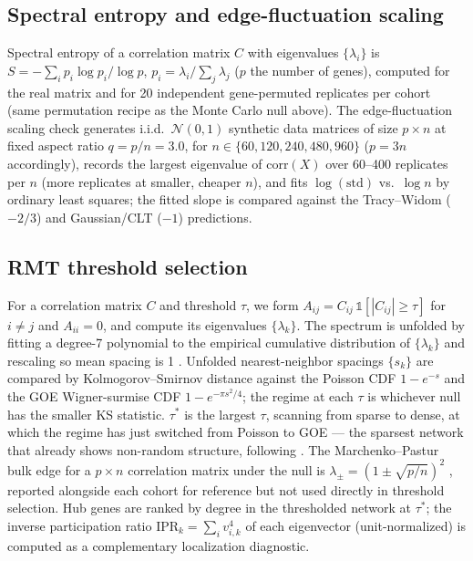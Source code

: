 \documentclass[11pt]{article}
\begin{document}
\subsection{Spectral entropy and edge-fluctuation scaling}

Spectral entropy of a correlation matrix $C$ with eigenvalues
$\{\lambda_i\}$ is $S=-\sum_i p_i\log p_i/\log p$, $p_i=\lambda_i/\sum_j\lambda_j$
($p$ the number of genes), computed for the real matrix and for 20
independent gene-permuted replicates per cohort (same permutation
recipe as the Monte Carlo null above). The edge-fluctuation scaling
check generates i.i.d.\ $\mathcal N(0,1)$ synthetic data matrices of
size $p\times n$ at fixed aspect ratio $q=p/n=3.0$, for
$n\in\{60,120,240,480,960\}$ ($p=3n$ accordingly), records the largest
eigenvalue of $\mathrm{corr}(X)$ over 60--400 replicates per $n$
(more replicates at smaller, cheaper $n$), and fits
$\log(\mathrm{std})$ vs.\ $\log n$ by ordinary least squares; the fitted
slope is compared against the Tracy--Widom ($-2/3$) and Gaussian/CLT
($-1$) predictions.

\subsection{RMT threshold selection}

For a correlation matrix $C$ and threshold $\tau$, we form
$A_{ij}=C_{ij}\,\mathbb{1}[|C_{ij}|\ge\tau]$ for $i\neq j$ and
$A_{ii}=0$, and compute its eigenvalues $\{\lambda_k\}$. The spectrum is
unfolded by fitting a degree-7 polynomial to the empirical cumulative
distribution of $\{\lambda_k\}$ and rescaling so mean spacing is 1
\citep{luo2007}. Unfolded nearest-neighbor spacings $\{s_k\}$ are
compared by Kolmogorov--Smirnov distance against the Poisson CDF
$1-e^{-s}$ and the GOE Wigner-surmise CDF $1-e^{-\pi s^2/4}$; the
regime at each $\tau$ is whichever null has the smaller KS statistic.
$\tau^*$ is the largest $\tau$, scanning from sparse to dense, at which
the regime has just switched from Poisson to GOE --- the sparsest
network that already shows non-random structure, following
\citet{luo2007}. The Marchenko--Pastur bulk edge for a $p\times n$
correlation matrix under the null is
$\lambda_\pm=(1\pm\sqrt{p/n})^2$ \citep{marchenkopastur1967}, reported
alongside each cohort for reference but not used directly in threshold
selection. Hub genes are ranked by degree in the thresholded network at
$\tau^*$; the inverse participation ratio
$\mathrm{IPR}_k=\sum_i v_{i,k}^4$ of each eigenvector (unit-normalized)
is computed as a complementary localization diagnostic.
\end{document}
